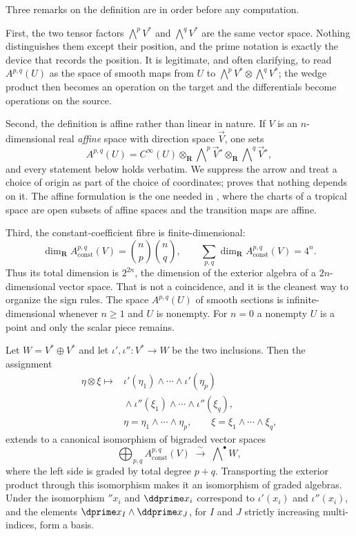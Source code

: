 Three remarks on the definition are in order before any computation.

First, the two tensor factors $\bigwedge^pV^*$ and $\bigwedge^qV^*$ are the
same vector space.  Nothing distinguishes them except their position, and the
prime notation is exactly the device that records the position.  It is
legitimate, and often clarifying, to read $A^{p,q}(U)$ as the space of smooth
maps from $U$ to $\bigwedge^pV^*\otimes\bigwedge^qV^*$; the wedge product then
becomes an operation on the target and the differentials become operations on
the source.

Second, the definition is affine rather than linear in nature.  If $V$ is an
$n$-dimensional real \emph{affine} space with direction space
$\overrightarrow V$, one sets
\[
 A^{p,q}(U)
 =C^\infty(U)\otimes_{\mathbf R}
   \bigwedge\nolimits^p\overrightarrow V{}^*
   \otimes_{\mathbf R}
   \bigwedge\nolimits^q\overrightarrow V{}^*,
\]
and every statement below holds verbatim.  We suppress the arrow and treat a
choice of origin as part of the choice of coordinates; 
proves that nothing depends on it.  The affine formulation is the one needed
in , where the charts of a tropical space are
open subsets of affine spaces and the transition maps are affine.

Third, the constant-coefficient fibre is finite-dimensional:
\[
 \dim_{\mathbf R}A_{\mathrm{const}}^{p,q}(V)=\binom np\binom nq,
 \qquad
 \sum_{p,q}\dim_{\mathbf R}A_{\mathrm{const}}^{p,q}(V)=4^n.
\]
Thus its total dimension is $2^{2n}$, the dimension of the exterior algebra
of a $2n$-dimensional vector space.  That is not a coincidence, and it is the
cleanest way to organize the sign rules.  The space $A^{p,q}(U)$ of smooth
sections is infinite-dimensional whenever $n\geq1$ and $U$ is nonempty.
For $n=0$ a nonempty $U$ is a point and only the scalar piece remains.

\begin{lemma}
\label{lem:ch09-exterior-of-double}
Let $W=V^*\oplus V^*$ and let $\iota',\iota'':V^*\to W$ be the two inclusions.
Then the assignment
\[
 \begin{aligned}
  \eta\otimes\xi\longmapsto{}&
  \iota'(\eta_1)\wedge\cdots\wedge\iota'(\eta_p)\\
  &{}\wedge\iota''(\xi_1)\wedge\cdots\wedge\iota''(\xi_q),\\
  &\eta=\eta_1\wedge\cdots\wedge\eta_p,
  \qquad \xi=\xi_1\wedge\cdots\wedge\xi_q,
 \end{aligned}
\]
extends to a canonical isomorphism of bigraded vector spaces
\[
 \bigoplus_{p,q}A_{\mathrm{const}}^{p,q}(V)
 \;\xrightarrow{\ \sim\ }\;
 \bigwedge\nolimits^{\bullet}W ,
\]
where the left side is graded by total degree $p+q$.  Transporting the
exterior product through this isomorphism makes it an isomorphism of graded
algebras.  Under the isomorphism $\dprime x_i$ and $\ddprime x_i$ correspond to
$\iota'(x_i)$ and $\iota''(x_i)$, and the elements
$\dprime x_I\wedge\ddprime x_J$, for $I$ and $J$ strictly increasing
multi-indices, form a basis.
\end{lemma}

